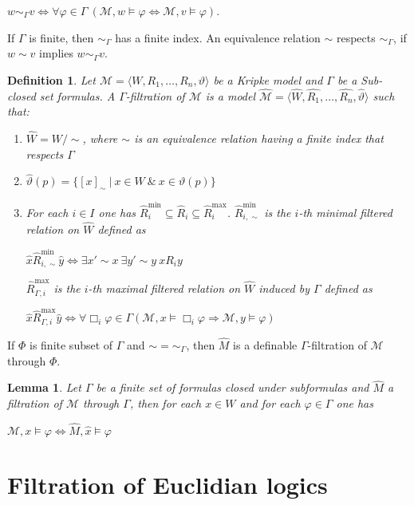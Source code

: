 \documentclass[a4paper]{article}
\theoremstyle{defin}
\newtheorem{defin}{Definition}
\theoremstyle{theorem}
\theoremstyle{prop}
\theoremstyle{lemma}
\newtheorem{lemma}{Lemma}
\theoremstyle{ex}
\theoremstyle{col}
\begin{document}
\begin{center}
  $w \sim_{\Gamma} v \Leftrightarrow \forall \varphi \in \Gamma \: (\mathcal{M}, w \models \varphi \Leftrightarrow \mathcal{M}, v \models \varphi)$.
\end{center}

If $\Gamma$ is finite, then $\sim_{\Gamma}$ has a finite index. An equivalence relation $\sim$ respects $\sim_{\Gamma}$, if $w \sim v$ implies $w \sim_{\Gamma} v$.

\begin{defin}
  Let $\mathcal{M} = \langle W, R_1, \dots, R_n, \vartheta \rangle$ be a Kripke model and $\Gamma$ be a Sub-closed set formulas. A $\Gamma$-filtration of $\mathcal{M}$ is a model
  $\widehat{\mathcal{M}} = \langle \widehat{W}, \widehat{R_1}, \dots, \widehat{R_n}, \widehat{\vartheta} \rangle$ such that:
  \begin{enumerate}
    \item $\widehat{W} = W / \sim$, where $\sim$ is an equivalence relation having a finite index that respects $\Gamma$
    \item $\widehat{\vartheta}(p) = \{ [x]_{\sim} \: | \: x \in W \: \& \: x \in \vartheta(p)\}$
    \item For each $i \in I$ one has $\widehat{R}_i^{\text{min}} \subseteq \widehat{R}_i \subseteq \widehat{R}_i^{\text{max}}$. $\widehat{R}_{i, \sim}^{\text{min}}$ is the $i$-th minimal filtered relation on $\widehat{W}$ defined as
    \begin{center}
      $\hat{x} \widehat{R}_{i, \sim}^{\text{min}} \hat{y} \Leftrightarrow \exists x' \sim x \: \exists y' \sim y \: x R_i y$
    \end{center}
    $\widehat{R}_{\Gamma,i}^{\text{max}}$ is the $i$-th maximal filtered relation on $\widehat{W}$ induced by $\Gamma$ defined as
    \begin{center}
      $\hat{x} \widehat{R}_{\Gamma,i}^{\text{max}} \hat{y} \Leftrightarrow \forall \Box_i \varphi \in \Gamma (\mathcal{M}, x \models \Box_i \varphi \Rightarrow \mathcal{M}, y \models \varphi)$
    \end{center}
  \end{enumerate}
\end{defin}

If $\Phi$ is finite subset of $\Gamma$ and $\sim = \sim_{\Gamma}$, then $\widehat{M}$ is a definable $\Gamma$-filtration of $\mathcal{M}$ through $\Phi$.

\begin{lemma}
  Let $\Gamma$ be a finite set of formulas closed under subformulas and $\widehat{M}$ a filtration of $\mathcal{M}$ through $\Gamma$, then for each $x \in W$ and for each $\varphi \in \Gamma$ one has
  \begin{center}
    $\mathcal{M}, x \models \varphi \Leftrightarrow \widehat{M}, \hat{x} \models \varphi$
  \end{center}
\end{lemma}

\section{Filtration of Euclidian logics}



\end{document}
